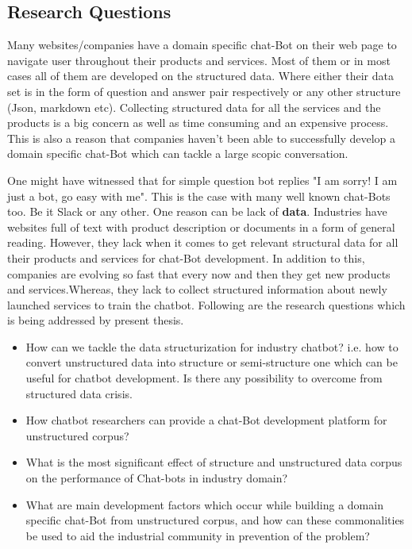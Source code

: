 \documentclass[a4paper,12pt]{article}
\begin{document}
\subsection{Research Questions}
Many websites/companies have a domain specific chat-Bot on their web page to navigate user throughout their products and services. Most of them or in most cases all of them are developed on the structured data. Where either their data set is in the form of question and answer pair respectively or any other structure (Json, markdown etc). Collecting structured data for all the services and the products is a big concern as well as time consuming and an expensive process. This is also a reason that companies haven't been able to successfully develop a domain specific chat-Bot which can tackle a large scopic conversation.
\bigskip

One might have witnessed that for simple question bot replies "I am sorry! I am just a bot, go easy with me". This is the case with many well known chat-Bots too. Be it Slack or any other. One reason can be lack of \textbf{data}. Industries have websites full of text with product description or documents in a form of general reading. However, they lack when it comes to get relevant structural data for all their products and services for chat-Bot development. In addition to this, companies are evolving so fast that every now and then they get new products and services.Whereas, they lack to collect structured information about newly launched services to train the chatbot. Following are the research questions which is being addressed by present thesis.
\begin{itemize}
\item How can we tackle the data structurization for industry chatbot? i.e. how to convert unstructured data into structure or semi-structure one which can be useful for chatbot development. Is there any possibility to overcome from structured data crisis.
\item How chatbot researchers can provide a chat-Bot development platform for unstructured corpus?
\item What is the most significant effect of structure and unstructured data corpus on the performance of Chat-bots in industry domain?
\item What are main development factors which occur while building a domain specific chat-Bot from unstructured corpus, and how can these commonalities be used to aid the industrial community in prevention of the problem?
\end{itemize}
\end{document}
